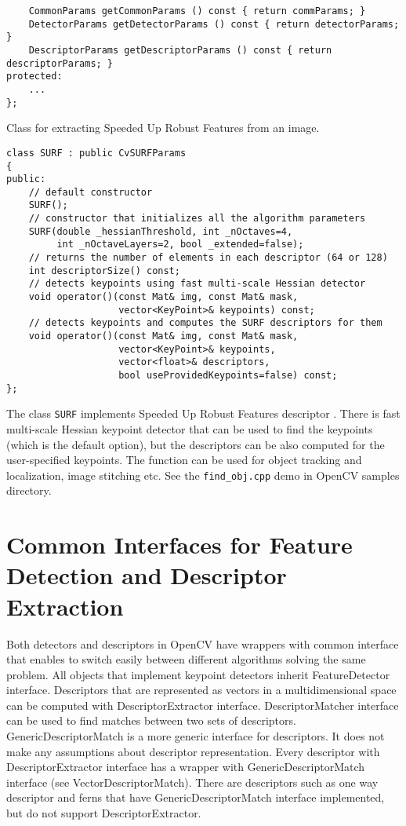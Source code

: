 \begin{lstlisting}
    CommonParams getCommonParams () const { return commParams; }
    DetectorParams getDetectorParams () const { return detectorParams; }
    DescriptorParams getDescriptorParams () const { return descriptorParams; }
protected:
    ...
};
\end{lstlisting}

Class for extracting Speeded Up Robust Features from an image.

\begin{lstlisting}
class SURF : public CvSURFParams
{
public:
    // default constructor
    SURF();
    // constructor that initializes all the algorithm parameters
    SURF(double _hessianThreshold, int _nOctaves=4,
         int _nOctaveLayers=2, bool _extended=false);
    // returns the number of elements in each descriptor (64 or 128)
    int descriptorSize() const;
    // detects keypoints using fast multi-scale Hessian detector
    void operator()(const Mat& img, const Mat& mask,
                    vector<KeyPoint>& keypoints) const;
    // detects keypoints and computes the SURF descriptors for them
    void operator()(const Mat& img, const Mat& mask,
                    vector<KeyPoint>& keypoints,
                    vector<float>& descriptors,
                    bool useProvidedKeypoints=false) const;
};
\end{lstlisting}

The class \texttt{SURF} implements Speeded Up Robust Features descriptor \cite{Bay06}.
There is fast multi-scale Hessian keypoint detector that can be used to find the keypoints
(which is the default option), but the descriptors can be also computed for the user-specified keypoints.
The function can be used for object tracking and localization, image stitching etc. See the
\texttt{find\_obj.cpp} demo in OpenCV samples directory.

\section{Common Interfaces for Feature Detection and Descriptor Extraction}
Both detectors and descriptors in OpenCV have wrappers with common interface that enables to switch easily 
between different algorithms solving the same problem. All objects that implement keypoint detectors inherit 
FeatureDetector interface. Descriptors that are represented as vectors in a multidimensional space can be 
computed with DescriptorExtractor interface. DescriptorMatcher interface can be used to find matches between 
two sets of descriptors. GenericDescriptorMatch is a more generic interface for descriptors. It does not make any 
assumptions about descriptor representation. Every descriptor with DescriptorExtractor interface has a wrapper with 
GenericDescriptorMatch interface (see VectorDescriptorMatch). There are descriptors such as one way descriptor and 
ferns that have GenericDescriptorMatch interface implemented, but do not support DescriptorExtractor.

